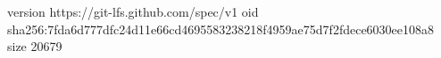version https://git-lfs.github.com/spec/v1
oid sha256:7fda6d777dfc24d11e66cd4695583238218f4959ae75d7f2fdece6030ee108a8
size 20679
